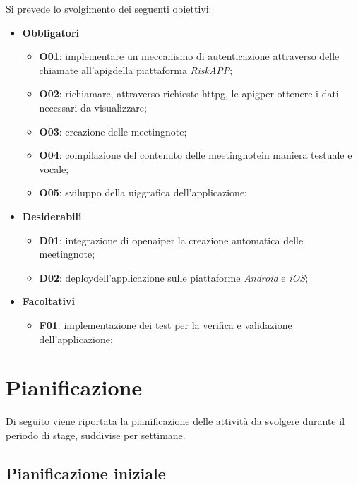 Si prevede lo svolgimento dei seguenti obiettivi:
\begin{itemize}
    \item \textbf{Obbligatori}
    \begin{itemize}
        \item \textbf{O01}\label{O01}: implementare un meccanismo di autenticazione attraverso delle chiamate all'\gls{apig}\glsoccur della piattaforma \emph{RiskAPP};
        \item \textbf{O02}\label{O02}: richiamare, attraverso richieste \gls{httpg}\glsoccur, le \gls{apig}\glsoccur per ottenere i dati necessari da visualizzare;
        \item \textbf{O03}\label{O03}: creazione delle \gls{meetingnote}\glsoccur;
        \item \textbf{O04}\label{O04}: compilazione del contenuto delle \gls{meetingnote}\glsoccur in maniera testuale e vocale;
        \item \textbf{O05}\label{O05}: sviluppo della \gls{uig}\glsoccur grafica dell'applicazione;
    \end{itemize}
    \item \textbf{Desiderabili}
    \begin{itemize}
        \item \textbf{D01}\label{D01}: integrazione di \gls{openai}\glsoccur per la creazione automatica delle \gls{meetingnote}\glsoccur;
        \item \textbf{D02}\label{D02}: \gls{deploy}\glsoccur dell'applicazione sulle piattaforme \emph{Android} e \emph{iOS};
    \end{itemize}
    \item \textbf{Facoltativi}
    \begin{itemize}
        \item \textbf{F01}\label{F01}: implementazione dei test per la verifica e validazione dell'applicazione;
    \end{itemize}
\end{itemize}

\section{Pianificazione}
\label{sec:pianificazione}

Di seguito viene riportata la pianificazione delle attività da svolgere durante il periodo di stage, suddivise per settimane.

\subsection{Pianificazione iniziale}
\label{subsec:pianificazione-iniziale}

